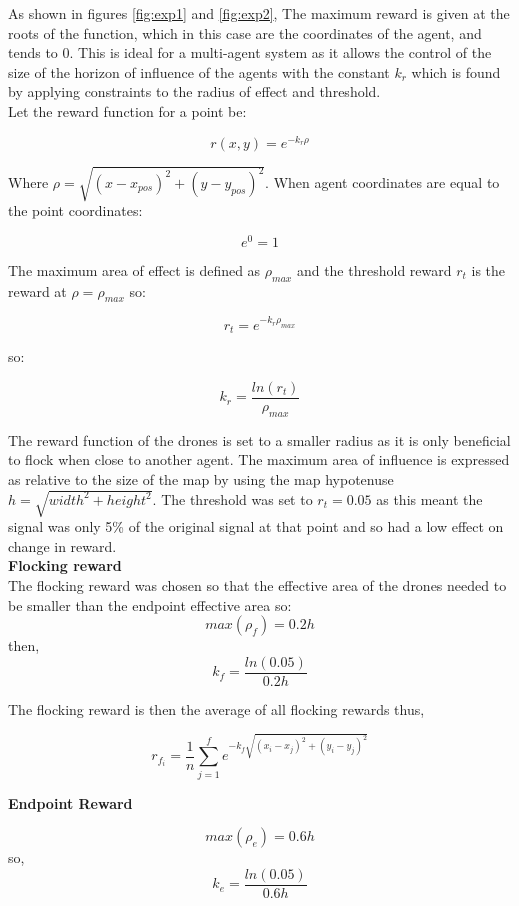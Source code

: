 As shown in figures \ref{fig:exp1} and \ref{fig:exp2}, The maximum reward is given at the roots of the function, which in this case are the coordinates of the agent, and tends to 0. This is ideal for a multi-agent system as it allows the control of the size of the horizon of influence of the agents with the constant $k_r$ which is found by applying constraints to the radius of effect and threshold.\hfill\vspace{0.5cm}\\

\noindent
Let the reward function for a point be:

\[r(x,y) = e^{-k_r\rho}\]


Where $\rho = \sqrt{(x-x_{pos})^2 + (y-y_{pos})^2}$. When agent coordinates are equal to the point coordinates:

\[e^0 = 1\]

The maximum area of effect is defined as $\rho_{max}$ and the threshold reward $r_t$ is the reward at $\rho = \rho_{max}$ so:

\[r_t = e^{-k_r\rho_{max}}\]

so:

\[k_r = \frac{ln(r_t)}{\rho_{max}}\]

The reward function of the drones is set to a smaller radius as it is only beneficial to flock when close to another agent. The maximum area of influence is expressed as relative to the size of the map by using the map hypotenuse $h = \sqrt{width^2 + height^2}$. The threshold was set to $r_t = 0.05$ as this meant the signal was only 5\% of the original signal at that point and so had a low effect on change in reward.\vspace{0.5cm}\\
\clearpage
\noindent
\textbf{Flocking reward}\\
\noindent
The flocking reward was chosen  so that the effective area of the drones needed to be smaller than the endpoint effective area so:
\[max(\rho_f) = 0.2h\]
then,
\[k_f = \frac{ln(0.05)}{0.2h}\]

The flocking reward is then the average of all flocking rewards thus,

\begin{equation}
    r_{f_{i}} = \frac{1}{n}\sum_{j=1}^{f} e^{-k_f\sqrt{({x}_i - {x}_j )^2 + ({y}_i - {y}_j)^2}}
    \label{equ:Frew}
\end{equation}


\noindent
\textbf{Endpoint Reward}

\[max(\rho_e) = 0.6h\]
so,
\[k_e = \frac{ln(0.05)}{0.6h}\]

